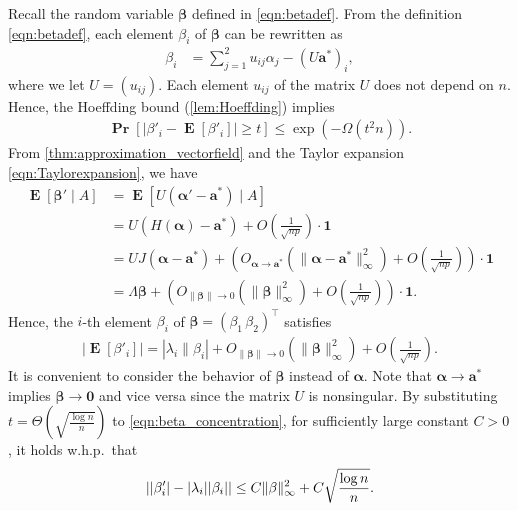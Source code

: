 \documentclass[letterpaper,11pt]{article}
\renewcommand\Pr{\mathop{\mathbf{Pr}}}
\DeclareMathOperator{\E}{\mathbf{E}}
\begin{document}
Recall the random variable ${\boldsymbol \beta}$ defined in \cref{eqn:betadef}.
From the definition \cref{eqn:betadef}, each element $\beta_i$ of ${\boldsymbol \beta}$ can be rewritten as
\begin{align}
\beta_i&=\sum_{j=1}^2 u_{ij} \alpha_j-(U\mathbf{a}^*)_i, \label{eqn:beta_sum_of_irv}
\end{align}
where we let $U=(u_{ij})$.
Each element $u_{ij}$ of the matrix $U$ does not depend on $n$.
Hence, the Hoeffding bound (\cref{lem:Hoeffding}) implies
\begin{align}
\Pr[|\beta'_i-\E[\beta'_i]|\geq t]\leq \exp\left(-\Omega(t^2n)\right). \label{eqn:beta_concentration}
\end{align}
From \cref{thm:approximation_vectorfield} and the Taylor expansion \cref{eqn:Taylorexpansion}, we have
\begin{align*}
\E[{\boldsymbol \beta}' \mid A] &= \E[U({\boldsymbol \alpha}'-\mathbf{a}^*) \mid A]\\
&=U(H({\boldsymbol \alpha})-\mathbf{a}^*)+O\left(\frac{1}{\sqrt{np}}\right)\cdot \mathbf{1}\\
&=UJ({\boldsymbol \alpha}-\mathbf{a}^*)+\left(O_{{\boldsymbol \alpha}\to \mathbf{a}^*}(\|{\boldsymbol \alpha}-\mathbf{a}^*\|_\infty^2)+O\left(\frac{1}{\sqrt{np}}\right)\right)\cdot \mathbf{1}\\
&=\Lambda {\boldsymbol \beta}+\left(O_{\|{\boldsymbol \beta}\|\to 0}(\|{\boldsymbol \beta}\|_\infty^2)+O\left(\frac{1}{\sqrt{np}}\right)\right)\cdot \mathbf{1}.
\end{align*}
Hence, the $i$-th element $\beta_i$ of ${\boldsymbol \beta}=(\beta_1\,\beta_2)^{\top}$ satisfies
\begin{align}
|\E[\beta'_i]| = |\lambda_i\|\beta_i|+O_{\|{\boldsymbol \beta}\|\to 0}(\|{\boldsymbol \beta}\|_\infty^2)+O\left(\frac{1}{\sqrt{np}}\right). \label{eqn:exp_beta'}
\end{align}
It is convenient to consider the behavior of ${\boldsymbol \beta}$ instead of ${\boldsymbol \alpha}$.
Note that ${\boldsymbol \alpha}\to \mathbf{a}^*$ implies ${\boldsymbol \beta}\to \mathbf{0}$ and vice versa since the matrix $U$ is nonsingular.
By substituting $t=\Theta\left(\sqrt{\frac{\log n}{n}}\right)$ to \cref{eqn:beta_concentration}, for sufficiently large constant $C>0$, it holds w.h.p.~that
\begin{align}
\left| |\beta'_i| - |\lambda_i||\beta_i| \right| \leq C\|{\boldmath \beta}\|_{\infty}^2+ C\sqrt{\frac{\log n}{n}}. \label{eqn:beta'bounds}
\end{align}
\end{document}
